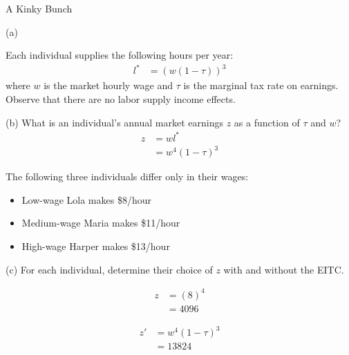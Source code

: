 \documentclass[10pt]{extarticle}
\begin{document}
\begin{problem}{A Kinky Bunch}
\begin{problem}{(a)}
\begin{center}
      \end{center}
    \end{problem}
    Each individual supplies the following hours per year:
    \begin{align*}
      l^{\ast} &= \left(w(1-\tau)\right)^3
    \end{align*}
    where $w$ is the market hourly wage and $\tau$ is the marginal tax rate on earnings. Observe that there are no labor supply income effects.
    \begin{problem}{(b)}
      What is an individual's annual market earnings $z$ as a function of $\tau$ and $w$?
      \tcblower
      \begin{align*}
        z &= wl^{\ast}\\
          &= w^{4}(1-\tau)^{3}
      \end{align*}
    \end{problem}
    The following three individuals differ only in their wages:
    \begin{itemize}
      \item Low-wage Lola makes \$8/hour
      \item Medium-wage Maria makes \$11/hour
      \item High-wage Harper makes \$13/hour
    \end{itemize}
    \begin{problem}{(c)}
      For each individual, determine their choice of $z$ with and without the EITC.
      \tcblower
      \begin{description}[font=\normalfont]
        \item[Lola without EITC:]
          \begin{align*}
            z &= (8)^4\\
                     &= 4096
          \end{align*}
        \item[Lola with EITC:]
          \begin{align*}
            z' &= w^{4}(1-\tau)^{3}\\
               &= 13824 \tag*{within $50\%$ subsidy, so valid}
          \end{align*}
        \item[Maria without EITC:]

\end{description}
\end{problem}
\end{problem}
\end{document}
